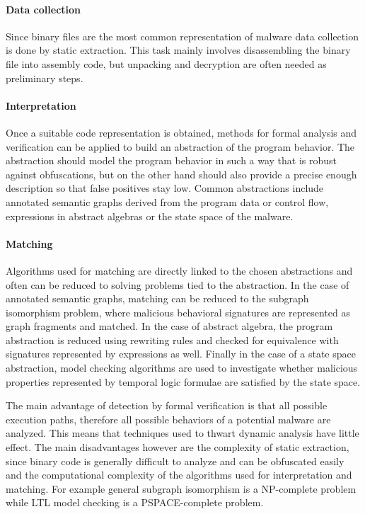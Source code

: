 \paragraph*{Data collection} Since binary files are the most common representation of malware data collection is done by static extraction. This task mainly involves disassembling the binary file into assembly code, but unpacking and decryption are often needed as preliminary steps.

\paragraph*{Interpretation} Once a suitable code representation is obtained, methods for formal analysis and verification can be applied to build an abstraction of the program behavior. The abstraction should model the program behavior in such a way that is robust against obfuscations, but on the other hand should also provide a precise enough description so that false positives stay low. Common abstractions include annotated semantic graphs derived from the program data or control flow, expressions in abstract algebras or the state space of the malware.

\paragraph*{Matching} Algorithms used for matching are directly linked to the chosen abstractions and often can be reduced to solving problems tied to the abstraction. In the case of annotated semantic graphs, matching can be reduced to the subgraph isomorphism problem, where malicious behavioral signatures are represented as graph fragments and matched. In the case of abstract algebra, the program abstraction is reduced using rewriting rules and checked for equivalence with signatures represented by expressions as well. Finally in the case of a state space abstraction, model checking algorithms are used to investigate whether malicious properties represented by temporal logic formulae are satisfied by the state space.

The main advantage of detection by formal verification is that all possible execution paths, therefore all possible behaviors of a potential malware are analyzed. This means that techniques used to thwart dynamic analysis have little effect. The main disadvantages however are the complexity of static extraction, since binary code is generally difficult to analyze and can be obfuscated easily and the computational complexity of the algorithms used for interpretation and matching. For example general subgraph isomorphism is a NP-complete\cite{Garey79} problem while LTL model checking is a PSPACE-complete problem\cite{Sistla85}.

